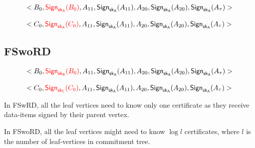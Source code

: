 \documentclass[%
  slidesonly,%
  semlayer%
  ]{seminar}                                  %
\newcommand{\sk}{\sf{sk}}
\begin{document}
\begin{slide}
        \begin{equation*}
          \begin{array}{l}
            <B_{0}, \textcolor{red}{\textsf{Sign}_{\sk_{A}}(B_{0})},A_{11},\textsf{Sign}_{\sk_{A}}(A_{11}),A_{20},\textsf{Sign}_{\sk_{A}}(A_{20}),\textsf{Sign}_{\sk_{A}}(A_{\tau})>\\
              \\
            <C_{0}, \textcolor{red}{\textsf{Sign}_{\sk_{A}}(C_{0})},A_{11},\textsf{Sign}_{\sk_{A}}(A_{11}),A_{20},\textsf{Sign}_{\sk_{A}}(A_{20}),\textsf{Sign}_{\sk_{A}}(A_{\tau})>\\ 
          \end{array}
        \end{equation*}
        \vfill
        \clearpage

      \subsection*{FSwoRD}
        \begin{equation*}
          \begin{array}{l}
            <B_{0}, \textcolor{red}{\textsf{Sign}_{\sk_{B}}(B_{0})},A_{11},\textsf{Sign}_{\sk_{A}}(A_{11}),A_{20},\textsf{Sign}_{\sk_{A}}(A_{20}),\textsf{Sign}_{\sk_{A}}(A_{\tau})>\\
              \\
            <C_{0}, \textcolor{red}{\textsf{Sign}_{\sk_{C}}(C_{0})},A_{11},\textsf{Sign}_{\sk_{A}}(A_{11}),A_{20},\textsf{Sign}_{\sk_{A}}(A_{20}),\textsf{Sign}_{\sk_{A}}(A_{\tau})>\\ 
          \end{array}
        \end{equation*}

        In FSwRD, all the leaf vertices need to know only one certificate as they receive data-items signed by their parent vertex.

        In FSwoRD, all the leaf vertices might need to know $\log l$ certificates, where $l$ is the number of leaf-vertices in commitment tree.
        \vfill
        \clearpage


\end{slide}
\end{document}
